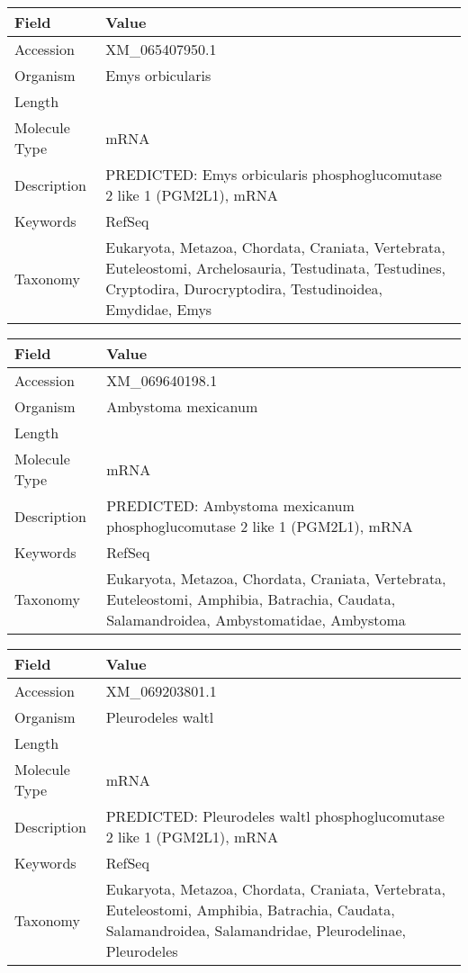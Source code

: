 \documentclass[10pt]{article}
\begin{document}
\vspace{1em}
{\footnotesize
\begin{longtable}{>{\raggedright\arraybackslash}p{4.5cm} >{\raggedright\arraybackslash}p{11.5cm}}
\textbf{Field} & \textbf{Value} \\
\hline
Accession & XM\_065407950.1 \\
Organism & Emys orbicularis \\
Length & 1857 \\
Molecule Type & mRNA \\
Description & PREDICTED: Emys orbicularis phosphoglucomutase 2 like 1 (PGM2L1), mRNA \\
Keywords & RefSeq \\
Taxonomy & Eukaryota, Metazoa, Chordata, Craniata, Vertebrata, Euteleostomi, Archelosauria, Testudinata, Testudines, Cryptodira, Durocryptodira, Testudinoidea, Emydidae, Emys \\
\end{longtable}
}

\vspace{1em}
{\footnotesize
\begin{longtable}{>{\raggedright\arraybackslash}p{4.5cm} >{\raggedright\arraybackslash}p{11.5cm}}
\textbf{Field} & \textbf{Value} \\
\hline
Accession & XM\_069640198.1 \\
Organism & Ambystoma mexicanum \\
Length & 3631 \\
Molecule Type & mRNA \\
Description & PREDICTED: Ambystoma mexicanum phosphoglucomutase 2 like 1 (PGM2L1), mRNA \\
Keywords & RefSeq \\
Taxonomy & Eukaryota, Metazoa, Chordata, Craniata, Vertebrata, Euteleostomi, Amphibia, Batrachia, Caudata, Salamandroidea, Ambystomatidae, Ambystoma \\
\end{longtable}
}

\vspace{1em}
{\footnotesize
\begin{longtable}{>{\raggedright\arraybackslash}p{4.5cm} >{\raggedright\arraybackslash}p{11.5cm}}
\textbf{Field} & \textbf{Value} \\
\hline
Accession & XM\_069203801.1 \\
Organism & Pleurodeles waltl \\
Length & 4691 \\
Molecule Type & mRNA \\
Description & PREDICTED: Pleurodeles waltl phosphoglucomutase 2 like 1 (PGM2L1), mRNA \\
Keywords & RefSeq \\
Taxonomy & Eukaryota, Metazoa, Chordata, Craniata, Vertebrata, Euteleostomi, Amphibia, Batrachia, Caudata, Salamandroidea, Salamandridae, Pleurodelinae, Pleurodeles \\
\end{longtable}
}
\end{document}
